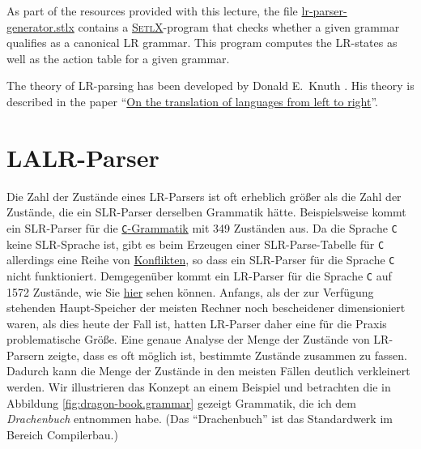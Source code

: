 \remarkEng
As part of the resources provided with this lecture,  the file
\href{https://github.com/karlstroetmann/Formal-Languages/tree/master/SetlX/lr-parser-generator.stlx}{lr-parser-generator.stlx}
contains a \href{http://wwwlehre.dhbw-stuttgart.de/~stroetma/SetlX/setlX.php}{\textsc{SetlX}}-program that
checks whether a given grammar qualifies as a canonical LR grammar.  This program computes the LR-states as well as the
action table for a given grammar.  \eox
\vspace*{0.3cm}

\remarkEng
The theory of LR-parsing has been developed by Donald E.~Knuth \cite{knuth:65}.  
His theory is described in the paper 
``\href{http://www.cs.dartmouth.edu/~mckeeman/cs48/mxcom/doc/knuth65.pdf}{On the translation of languages from left to right}''.
\eox
\pagebreak

\section{LALR-Parser}
Die Zahl der Zust\"ande eines LR-Parsers ist oft erheblich gr\"o{\ss}er als die Zahl der Zust\"ande, die ein
SLR-Parser derselben Grammatik h\"atte.  Beispielsweise kommt ein SLR-Parser f\"ur die
\href{https://github.com/karlstroetmann/Formal-Languages/blob/master/SetlX/Examples/c-grammar.g}{\texttt{C}-Grammatik} 
mit 349 Zust\"anden aus.  Da die Sprache \texttt{C} keine SLR-Sprache ist, gibt es beim Erzeugen
einer SLR-Parse-Tabelle f\"ur \texttt{C} allerdings eine Reihe von 
\href{https://github.com/karlstroetmann/Formal-Languages/blob/master/SetlX/Examples/c-grammar-slr-table.txt}{Konflikten},
so dass ein SLR-Parser f\"ur die Sprache \texttt{C} nicht funktioniert.  Demgegen\"uber kommt ein
LR-Parser f\"ur die Sprache \texttt{C} auf 1572 Zust\"ande, wie Sie 
\href{https://github.com/karlstroetmann/Formal-Languages/blob/master/SetlX/Examples/c-grammar-lr-table.txt}{hier}
sehen k\"onnen.  Anfangs, als der zur Verf\"ugung stehenden
Haupt-Speicher der meisten Rechner noch bescheidener dimensioniert waren, als dies heute
der Fall ist, hatten LR-Parser daher eine f\"ur die Praxis problematische
Gr\"o{\ss}e.  Eine genaue Analyse der Menge der Zust\"ande von LR-Parsern zeigte, dass es oft m\"oglich ist, 
bestimmte Zust\"ande zusammen zu fassen.  Dadurch kann die Menge der Zust\"ande in den meisten F\"allen
deutlich verkleinert werden.  Wir illustrieren das Konzept an einem Beispiel und betrachten die in
Abbildung \ref{fig:dragon-book.grammar} gezeigt Grammatik, die ich dem \emph{Drachenbuch}
\cite{aho:2006} entnommen habe.  (Das ``Drachenbuch'' ist das Standardwerk im Bereich Compilerbau.)



